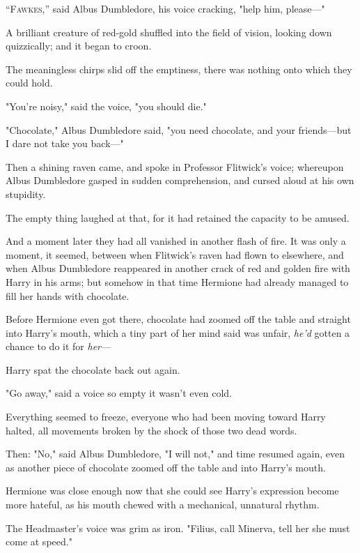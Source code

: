 
\lettrine{“F}{awkes,''} said
Albus Dumbledore, his voice cracking, "help him, please\mbox{---}"

A brilliant creature of red-gold shuffled into the field of vision, looking
down quizzically; and it began to croon.

The meaningless chirps slid off the emptiness, there was nothing onto which
they could hold.

"You're noisy," said the voice, "you should die."

"Chocolate," Albus Dumbledore said, "you need chocolate, and your friends---but
I dare not take you back\mbox{---}"

Then a shining raven came, and spoke in Professor Flitwick's voice; whereupon
Albus Dumbledore gasped in sudden comprehension, and cursed aloud at his own
stupidity.

The empty thing laughed at that, for it had retained the capacity to be amused.

And a moment later they had all vanished in another flash of fire.
\sbreak
It was only a moment, it seemed, between when Flitwick's raven had flown to
elsewhere, and when Albus Dumbledore reappeared in another crack of red and
golden fire with Harry in his arms; but somehow in that time Hermione had
already managed to fill her hands with chocolate.

Before Hermione even got there, chocolate had zoomed off the table and straight
into Harry's mouth, which a tiny part of her mind said was unfair, \emph{he'd}
gotten a chance to do it for \emph{her---}

Harry spat the chocolate back out again.

"Go away," said a voice so empty it wasn't even cold.

{\el}

Everything seemed to freeze, everyone who had been moving toward Harry halted,
all movements broken by the shock of those two dead words.

Then: "No," said Albus Dumbledore, "I will not," and time resumed again, even
as another piece of chocolate zoomed off the table and into Harry's mouth.

Hermione was close enough now that she could see Harry's expression become more
hateful, as his mouth chewed with a mechanical, unnatural rhythm.

The Headmaster's voice was grim as iron. "Filius, call Minerva, tell her she
must come at speed."

